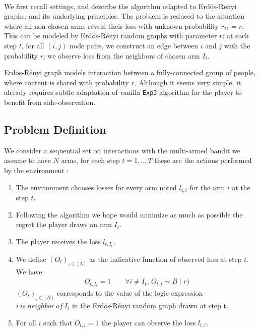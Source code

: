 \documentclass[11pt,a4paper]{article}
\begin{document}
\paragraph{}We first recall \cite{valko} settings, and describe the algorithm adapted to Erdös-Renyi graphs, and its underlying principles. The problem is reduced to the situation where all non-chosen arms reveal their loss with unknown probability $r_{11}=r$. This can be modeled by Erdös-Rényi random graphs with parameter $r$: at each step $t$, for all $(i,j)$ node pairs, we construct an edge between $i$ and $j$ with the probability $r$; we observe loss from the neighbors of chosen arm $I_t$.

Erdös-Rényi graph models interaction between a fully-connected group of people, where content is shared with probability $r$. Although it seems very simple, it already requires subtle adaptation of vanilla \verb|Exp3| algorithm for the player to benefit from side-observation.

\subsection{Problem Definition}
We consider a sequential set on interactions with the multi-armed bandit we assume to have $N$ arms, for each step $t=1,..,T$ these are the actions performed by the environment : 
\begin{enumerate}
\item The environment chooses losses for every arm noted $l_{t,i}$ for the arm $i$ at the step $t$.
\item Following the algorithm we hope would minimize as much as possible the regret the player draws an arm $I_t$.
\item The player receives the loss $l_{t,I_t}$.
\item We define $\left(O_t\right)_{_i\in\left[N\right]}$ as the indicative function of observed loss at step $t$. We have:
\begin{align*}
O_{t,I_t}=1 \qquad \forall i \neq I_t,\, O_{t,i} \sim B\left(r\right.)
\end{align*}
$\left(O_t\right)_{_i\in\left[N\right]}$ corresponds to the value of the logic expression $ i \ is\ neighbor\ of\ I_t$ in the Erdös-Rényi random graph drawn at step t.
\item For all $i$ such that $O_{t,i}=1$ the player can observe the loss $l_{t,i}$.
\end{enumerate}
 
\end{document}
